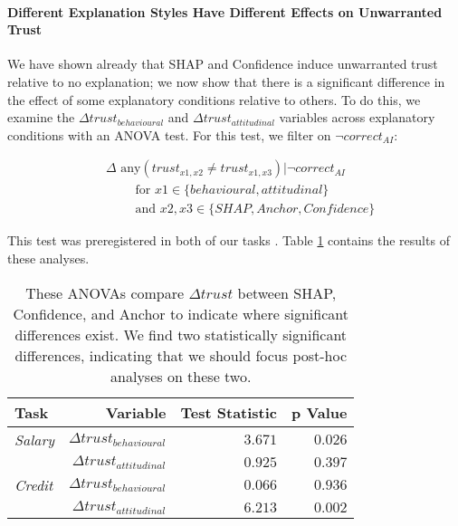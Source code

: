 \paragraph{Different Explanation Styles Have Different Effects on Unwarranted Trust}
We have shown already that SHAP and Confidence induce unwarranted trust relative to no explanation; we now show that there is a significant difference in the effect of some explanatory conditions relative to others. To do this, we examine the $\Delta trust_{behavioural}$ and $\Delta trust_{attitudinal}$ variables across explanatory conditions with an ANOVA test. For this test, we filter on $\neg correct_{AI}$: 

\begin{equation}
\label{eq:different}
    \begin{split}
        & \Delta \text{ any} (trust_{x1,x2} \neq trust_{x1,x3}) | \neg correct_{AI} \\
        & \qquad \text{ for } x1 \in \{behavioural, attitudinal\} \\
        & \qquad \text{ and } x2,x3 \in \{SHAP, Anchor, Confidence\}
    \end{split}
\end{equation}

\noindent This test was preregistered in both of our tasks \cite{natarajan_binns_2022}. Table \ref{tab:delta-trust-anova} contains the results of these analyses.

\begin{table}[htb]
    \centering
    \caption{These ANOVAs compare $\Delta trust$ between SHAP, Confidence, and Anchor to indicate where significant differences exist. We find two statistically significant differences, indicating that we should focus post-hoc analyses on these two.}
    \label{tab:delta-trust-anova}
    \begin{tabular}{lrrr}
        \toprule
        Task & Variable & Test Statistic & p Value \\
        \midrule
        \emph{Salary} & $\Delta trust_{behavioural}$ & $\mathbf{3.671}$ & $\mathbf{0.026}$ \\
        & $\Delta trust_{attitudinal}$ & $0.925$ & $0.397$ \\
        \midrule
        \emph{Credit} & $\Delta trust_{behavioural}$ & $0.066$ & $0.936$ \\
        & $\Delta trust_{attitudinal}$ & $\mathbf{6.213}$ & $\mathbf{0.002}$ \\
        \bottomrule
    \end{tabular}
\end{table}

